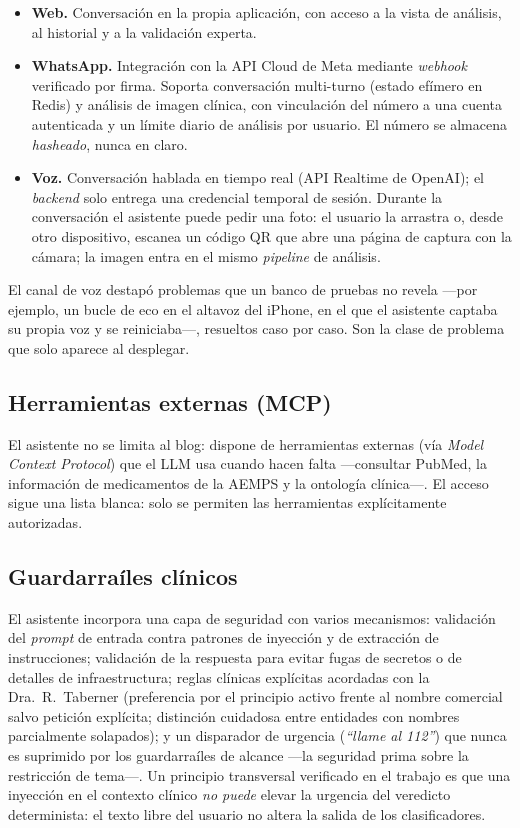 \begin{itemize}
  \item \textbf{Web.} Conversación en la propia aplicación, con acceso a la
  vista de análisis, al historial y a la validación experta.
  \item \textbf{WhatsApp.} Integración con la API Cloud de Meta mediante
  \emph{webhook} verificado por firma. Soporta conversación multi-turno
  (estado efímero en Redis) y análisis de imagen clínica, con vinculación
  del número a una cuenta autenticada y un límite diario de análisis por
  usuario. El número se almacena \emph{hasheado}, nunca en claro.
  \item \textbf{Voz.} Conversación hablada en tiempo real (API Realtime de
  OpenAI); el \emph{backend} solo entrega una credencial temporal de
  sesión. Durante la conversación el asistente puede pedir una foto: el
  usuario la arrastra o, desde otro dispositivo, escanea un código QR que
  abre una página de captura con la cámara; la imagen entra en el mismo
  \emph{pipeline} de análisis.
\end{itemize}

El canal de voz destapó problemas que un banco de pruebas no revela
---por ejemplo, un bucle de eco en el altavoz del iPhone, en el que el
asistente captaba su propia voz y se reiniciaba---, resueltos caso por
caso. Son la clase de problema que solo aparece al desplegar.

\subsection{Herramientas externas (MCP)}
\label{sec:proto-mcp}

El asistente no se limita al blog: dispone de herramientas externas (vía
\emph{Model Context Protocol}) que el LLM usa cuando hacen falta
---consultar PubMed, la información de medicamentos de la AEMPS y la
ontología clínica---. El acceso sigue una lista blanca: solo se permiten
las herramientas explícitamente autorizadas.

\subsection{Guardarraíles clínicos}
\label{sec:proto-guardrails}

El asistente incorpora una capa de seguridad con varios mecanismos:
validación del \emph{prompt} de entrada contra patrones de inyección y de
extracción de instrucciones; validación de la respuesta para evitar fugas
de secretos o de detalles de infraestructura; reglas clínicas explícitas
acordadas con la Dra.~R.~Taberner (preferencia por el principio activo
frente al nombre comercial salvo petición explícita; distinción cuidadosa
entre entidades con nombres parcialmente solapados); y un disparador de
urgencia (\emph{``llame al 112''}) que nunca es suprimido por los
guardarraíles de alcance ---la seguridad prima sobre la restricción de
tema---. Un principio transversal verificado en el trabajo es que una
inyección en el contexto clínico \emph{no puede} elevar la urgencia del
veredicto determinista: el texto libre del usuario no altera la salida de
los clasificadores.

